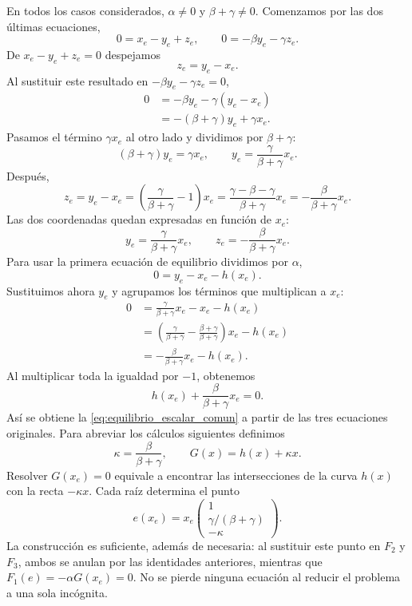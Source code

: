 En todos los casos considerados, \(\alpha\neq0\) y
\(\beta+\gamma\neq0\). Comenzamos por las dos últimas ecuaciones,
\[
0=x_e-y_e+z_e,\qquad
0=-\beta y_e-\gamma z_e.
\]
De \(x_e-y_e+z_e=0\) despejamos
\[
z_e=y_e-x_e.
\]
Al sustituir este resultado en \(-\beta y_e-\gamma z_e=0\),
\begin{align*}
0
&=-\beta y_e-\gamma(y_e-x_e)\\
&=-(\beta+\gamma)y_e+\gamma x_e.
\end{align*}
Pasamos el término \(\gamma x_e\) al otro lado y dividimos por
\(\beta+\gamma\):
\[
(\beta+\gamma)y_e=\gamma x_e,
\qquad y_e=\frac{\gamma}{\beta+\gamma}x_e.
\]
Después,
\[
z_e=y_e-x_e
=\left(\frac{\gamma}{\beta+\gamma}-1\right)x_e
=\frac{\gamma-\beta-\gamma}{\beta+\gamma}x_e
=-\frac{\beta}{\beta+\gamma}x_e.
\]
Las dos coordenadas quedan expresadas en función de \(x_e\):
\begin{equation}
y_e=\frac{\gamma}{\beta+\gamma}x_e,\qquad
z_e=-\frac{\beta}{\beta+\gamma}x_e.
\label{eq:equilibrios_yz}
\end{equation}
Para usar la primera ecuación de equilibrio dividimos por \(\alpha\),
\[
0=y_e-x_e-h(x_e).
\]
Sustituimos ahora \(y_e\) y agrupamos los términos que multiplican a \(x_e\):
\begin{align*}
0
&=\frac{\gamma}{\beta+\gamma}x_e-x_e-h(x_e)\\
&=\left(\frac{\gamma}{\beta+\gamma}
       -\frac{\beta+\gamma}{\beta+\gamma}\right)x_e-h(x_e)\\
&=-\frac{\beta}{\beta+\gamma}x_e-h(x_e).
\end{align*}
Al multiplicar toda la igualdad por \(-1\), obtenemos
\begin{equation}
h(x_e)+\frac{\beta}{\beta+\gamma}x_e=0.
\label{eq:equilibrio_escalar_comun}
\end{equation}
Así se obtiene la \cref{eq:equilibrio_escalar_comun} a partir de las tres
ecuaciones originales. Para abreviar los cálculos siguientes definimos
\[
\kappa=\frac{\beta}{\beta+\gamma},
\qquad
G(x)=h(x)+\kappa x.
\]
Resolver \(G(x_e)=0\) equivale a encontrar las intersecciones de la curva
\(h(x)\) con la recta \(-\kappa x\). Cada raíz determina el punto
\[
e(x_e)=x_e
\begin{pmatrix}1\\ \gamma/(\beta+\gamma)\\-\kappa\end{pmatrix}.
\]
La construcción es suficiente, además de necesaria: al sustituir este punto
en \(F_2\) y \(F_3\), ambos se anulan por las identidades anteriores, mientras
que \(F_1(e)=-\alpha G(x_e)=0\). No se pierde ninguna ecuación al reducir
el problema a una sola incógnita.

